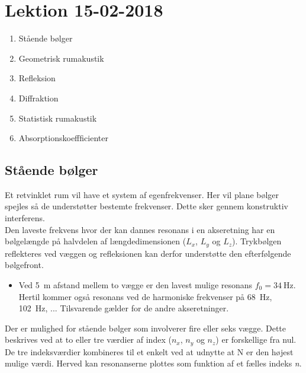 \section{Lektion 15-02-2018}

\begin{enumerate}
	\item Stående bølger
	\item Geometrisk rumakustik
	\item Refleksion
	\item Diffraktion
	\item Statistisk rumakustik
	\item Absorptionskoeffficienter
\end{enumerate}

\noindent{} \vspace{3mm}

\subsection{Stående bølger}
Et retvinklet rum vil have et system af egenfrekvenser. Her vil plane bølger spejles så de understøtter bestemte frekvenser. Dette sker gennem konstruktiv interferens. \\

\noindent Den laveste frekvens hvor der kan dannes resonans i en akseretning har en bølgelængde på halvdelen af længdedimensionen ($L_x$, $L_y$ og $L_z$). Trykbølgen reflekteres ved væggen og refleksionen kan derfor understøtte den efterfølgende bølgefront.
\begin{itemize}
	\item Ved \SI{5}{\meter} afstand mellem to vægge er den lavest mulige resonans $f_0 = \SI{34}{\hertz}$. Hertil kommer også resonans ved de harmoniske frekvenser på \SI{68}{\hertz}, \SI{102}{\hertz}, ... Tilsvarende gælder for de andre akseretninger.
\end{itemize}
Der er mulighed for stående bølger som involverer fire eller seks vægge.
Dette beskrives ved at to eller tre værdier af index ($n_x$, $n_y$ og $n_z$) er forskellige fra nul. 
De tre indeksværdier kombineres til et enkelt ved at udnytte at N er den højest mulige værdi. Herved kan resonanserne plottes som
funktion af et fælles indeks \textit{n}.\\

